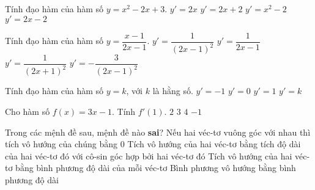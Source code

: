 \begin{ex}%
	Tính đạo hàm của hàm số $y=x^2-2x+3$.
	\choice
	{$y'=2x $}
	{$y'=2x+2 $}
	{$y'=x^2-2 $}
	{\True $y'=2x-2 $}
\end{ex}

\begin{ex}%
	Tính đạo hàm của hàm số $y=\dfrac{x-1}{2x-1}$.
	\choice
	{\True $y'=\dfrac{1}{(2x-1)^2} $}
	{$y'=\dfrac{1}{2x-1} $}
	{$y'=\dfrac{1}{(2x+1)^2} $}
	{$y'=-\dfrac{3}{(2x-1)^2} $}
\end{ex}

\begin{ex}%
	Tính đạo hàm của hàm số $y=k$, với $k$ là hằng số.
	\choice
	{$y'=-1 $}
	{\True $y'=0 $}
	{$y'=1 $}
	{$y'=k $}
\end{ex}

\begin{ex}%
	Cho hàm số $f(x)=3x-1$. Tính $f'(1)$.
	\choice
	{$2 $}
	{\True $3 $}
	{$4 $}
	{$-1 $}
\end{ex}

\begin{ex}%
	Trong các mệnh đề sau, mệnh đề nào \textbf{sai}?
	\choice
	{Nếu hai véc-tơ vuông góc với nhau thì tích vô hướng của chúng bằng $0$}
	{Tích vô hướng của hai véc-tơ bằng tích độ dài của hai véc-tơ đó với cô-sin góc hợp bởi hai véc-tơ đó}
	{\True Tích vô hướng của hai véc-tơ bằng bình phương độ dài của mỗi véc-tơ}
	{Bình phương vô hướng bằng bình phương độ dài}
\end{ex}

